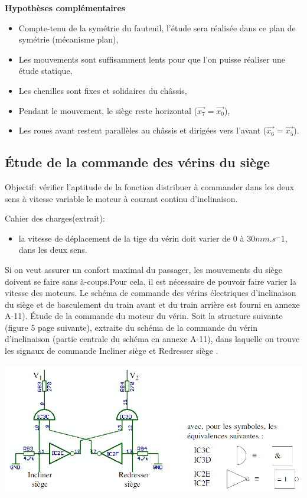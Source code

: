 \textbf{Hypothèses complémentaires}
\begin{itemize}
 \item Compte-tenu de la symétrie du fauteuil, l'étude sera réalisée dans ce plan de symétrie (mécanisme plan),
 \item Les mouvements sont suffisamment lents pour que l'on puisse réaliser une étude statique,
 \item Les chenilles sont fixes et solidaires du châssis,
 \item Pendant le mouvement, le siège reste horizontal ($\overrightarrow{x_7}=\overrightarrow{x_0}$),
 \item Les roues avant restent parallèles au châssis et dirigées vers l'avant ($\overrightarrow{x_6}=\overrightarrow{x_5}$).
\end{itemize}

\subsection{Étude de la commande des vérins du siège}

Objectif: vérifier l'aptitude de la fonction \og distribuer \fg à commander dans les deux sens à vitesse variable le moteur à courant continu d'inclinaison.

Cahier des charges(extrait):
\begin{itemize}
 \item la vitesse de déplacement de la tige du vérin doit varier de $0$ à $30 mm.s^-1$, dans les deux sens.
\end{itemize}

Si on veut assurer un confort maximal du passager, les mouvements du siège doivent se faire sans à-coups.Pour cela, il est nécessaire de pouvoir faire varier la vitesse des moteurs. Le schéma de commande des vérins électriques d'inclinaison du siège et de basculement du train avant et du train arrière est fourni en annexe A-11). Étude de la commande du moteur du vérin. Soit la structure suivante (figure 5 page suivante), extraite du schéma de la commande du vérin d'inclinaison (partie centrale du schéma en annexe A-11), dans laquelle on trouve les signaux de commande \og Incliner siège \fg et \og Redresser siège \fg.

\begin{center}
 \includegraphics[width=0.8\linewidth]{img/img01}
\end{center}

